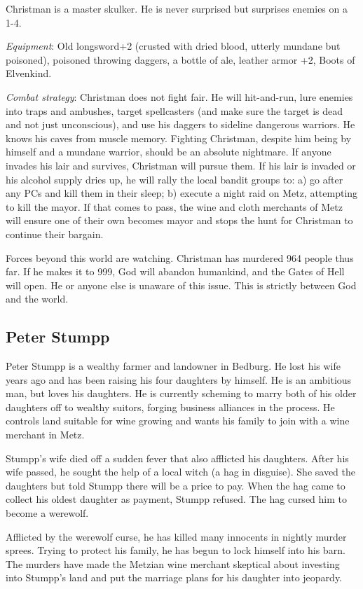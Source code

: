 \documentclass[
]{book}
\begin{document}
Christman is a master skulker. He is never surprised but surprises enemies on a 1-4.

\emph{Equipment}: Old longsword+2 (crusted with dried blood, utterly mundane but poisoned), poisoned throwing daggers, a bottle of ale, leather armor +2, Boots of Elvenkind.

\emph{Combat strategy}: Christman does not fight fair. He will hit-and-run, lure enemies into traps and ambushes, target spellcasters (and make sure the target is dead and not just unconscious), and use his daggers to sideline dangerous warriors. He knows his caves from muscle memory. Fighting Christman, despite him being by himself and a mundane warrior, should be an absolute nightmare. If anyone invades his lair and survives, Christman will pursue them. If his lair is invaded or his alcohol supply dries up, he will rally the local bandit groups to: a) go after any PCs and kill them in their sleep; b) execute a night raid on Metz, attempting to kill the mayor. If that comes to pass, the wine and cloth merchants of Metz will ensure one of their own becomes mayor and stops the hunt for Christman to continue their bargain.

Forces beyond this world are watching. Christman has murdered 964 people thus far. If he makes it to 999, God will abandon humankind, and the Gates of Hell will open. He or anyone else is unaware of this issue. This is strictly between God and the world.

\subsection{Peter Stumpp}\label{peter-stumpp}

Peter Stumpp is a wealthy farmer and landowner in Bedburg. He lost his wife years ago and has been raising his four daughters by himself. He is an ambitious man, but loves his daughters. He is currently scheming to marry both of his older daughters off to wealthy suitors, forging business alliances in the process. He controls land suitable for wine growing and wants his family to join with a wine merchant in Metz.

Stumpp's wife died off a sudden fever that also afflicted his daughters. After his wife passed, he sought the help of a local witch (a hag in disguise). She saved the daughters but told Stumpp there will be a price to pay. When the hag came to collect his oldest daughter as payment, Stumpp refused. The hag cursed him to become a werewolf.

Afflicted by the werewolf curse, he has killed many innocents in nightly murder sprees. Trying to protect his family, he has begun to lock himself into his barn. The murders have made the Metzian wine merchant skeptical about investing into Stumpp's land and put the marriage plans for his daughter into jeopardy.
\end{document}
